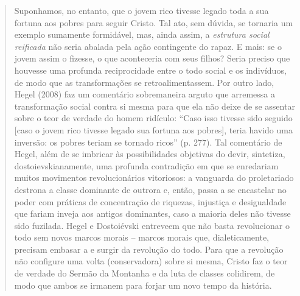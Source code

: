 {\begin{quote}
Suponhamos, no entanto, que o jovem rico tivesse legado toda a sua
fortuna aos pobres para seguir Cristo. Tal ato, sem dúvida, se tornaria
um exemplo sumamente formidável, mas, ainda assim, a \emph{estrutura
social reificada} não seria abalada pela ação contingente do rapaz. E
mais: se o jovem assim o fizesse, o que aconteceria com seus filhos?
Seria preciso que houvesse uma profunda reciprocidade entre o todo
social e os indivíduos, de modo que as transformações se
retroalimentassem. Por outro lado, Hegel (2008) faz um comentário
sobremaneira arguto que arremessa a transformação social contra si mesma
para que ela não deixe de se assentar sobre o teor de verdade do homem
ridículo: ``Caso isso tivesse sido seguido {[}caso o jovem rico tivesse
legado sua fortuna aos pobres{]}, teria havido uma inversão: os pobres
teriam se tornado ricos'' (p. 277). Tal comentário de Hegel, além de se
imbricar às possibilidades objetivas do devir, sintetiza,
dostoievskianamente, uma profunda contradição em que se enredariam
muitos movimentos revolucionários vitoriosos: a vanguarda do
proletariado destrona a classe dominante de outrora e, então, passa a se
encastelar no poder com práticas de concentração de riquezas, injustiça
e desigualdade que fariam inveja aos antigos dominantes, caso a maioria
deles não tivesse sido fuzilada. Hegel e Dostoiévski entreveem que não
basta revolucionar o todo sem novos marcos morais -- marcos morais que,
dialeticamente, precisam embasar a e surgir da revolução do todo. Para
que a revolução não configure uma volta (conservadora) sobre si mesma,
Cristo faz o teor de verdade do Sermão da Montanha e da luta de classes
colidirem, de modo que ambos se irmanem para forjar um novo tempo da
história.


\end{quote}}

